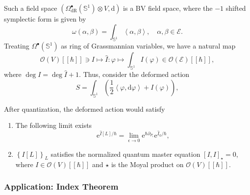 \documentclass[10pt]{article}
\begin{document}
Such a field space $\left( \Omega_{\mathrm{dR}}^{\bullet}(\mathbb{S}^{1}) \otimes V, \mathrm{d}  \right)$ is a BV field space, where the $-1$ shifted symplectic form is given by
\begin{equation*}
  \omega(\alpha, \beta) = \int _{\mathbb{S}^{1}} \left< \alpha, \beta \right>,\quad \alpha, \beta \in \mathcal{E}.
\end{equation*}
Treating $ \Omega^{\bullet}(\mathbb{S}^{1})$ as ring of Grassmannian variables, we have a natural map
\begin{equation*}
  \mathcal{O}(V)[[\hbar]] \ni I \mapsto \hat{I}: \varphi \mapsto \int _{\mathbb{S}^{1}} I(\varphi) \in \mathcal{O}(\mathcal{E})[[\hbar]],
\end{equation*}
where $ \deg I = \deg \hat{I} + 1$.
Thus, consider the deformed action
\begin{equation*}
  S = \int _{\mathbb{S}^{1}} \left( \frac{1}{2} \left< \varphi, \mathrm{d} \varphi \right> + I(\varphi) \right),
\end{equation*}
\begin{theorem}
  After quantization, the deformed action would satisfy
  \begin{enumerate}[(1)]
    \item The following limit exists
      \begin{equation*}
        \mathrm{e}^{\hat{I}[L] / \hbar} = \lim_{\epsilon \to 0} \mathrm{e}^{\hbar \partial_{P_{\epsilon}}} \mathrm{e}^{\hat{I}_0 / \hbar},
      \end{equation*}
    \item $\left\{ I[L] \right\}_{L}$ satisfies the normalized quantum master equation $ \left[ I, I \right]_{\star} = 0$, where $ I \in \mathcal{O}(V)[[\hbar]]$ and $\star$ is the Moyal product on $ \mathcal{O}(V)[[\hbar]]$.
  \end{enumerate}
\end{theorem}

\subsubsection{Application: Index Theorem}
\end{document}
